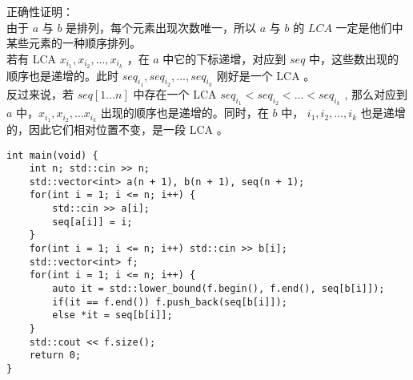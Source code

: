 \documentclass{beamer}
\begin{document}
\begin{frame}
正确性证明：\\
由于 $a$ 与 $b$ 是排列，每个元素出现次数唯一，所以 $a$ 与 $b$ 的 $LCA$ 一定是他们中某些元素的一种顺序排列。 \\ 
若有 LCA $x_{i_{1}},x_{i_{2}},...,x_{i_{k}}$ ，在 $a$ 中它的下标递增，对应到 $seq$ 中，这些数出现的顺序也是递增的。此时 $seq_{i_{1}},seq_{i_{2}},...,seq_{i_{k}}$ 刚好是一个 LCA 。 \\ 
反过来说，若 $seq[1...n]$ 中存在一个 LCA $seq_{i_{1}} < seq_{i_{2}} < ... < seq_{i_{k}}$ , 那么对应到 $a$ 中，$x_{i_{1}},x_{i_{2}},...x_{i_{k}}$ 出现的顺序也是递增的。同时，在 $b$ 中， $i_1, i_2, ... , i_k$ 也是递增的，因此它们相对位置不变，是一段 LCA 。
\end{frame}
\begin{frame}[fragile]
\begin{onlyenv}
\begin{verbatim}
int main(void) {
    int n; std::cin >> n;
    std::vector<int> a(n + 1), b(n + 1), seq(n + 1);
    for(int i = 1; i <= n; i++) {
        std::cin >> a[i];
        seq[a[i]] = i;
    }
    for(int i = 1; i <= n; i++) std::cin >> b[i];
    std::vector<int> f;
    for(int i = 1; i <= n; i++) {
        auto it = std::lower_bound(f.begin(), f.end(), seq[b[i]]);
        if(it == f.end()) f.push_back(seq[b[i]]);
        else *it = seq[b[i]];
    }
    std::cout << f.size();
    return 0;
}
\end{verbatim}
\end{onlyenv}
\end{frame}
\end{document}
